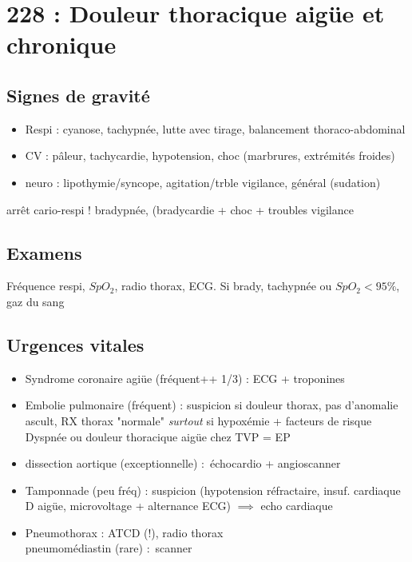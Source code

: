 \documentclass{article}
\newcommand*{\TakeFourierOrnament}[1]{{%
\fontencoding{U}\fontfamily{futs}\selectfont\char#1}}
\newcommand*{\danger}{\TakeFourierOrnament{66}}
\begin{document}
\appendix
\section{228 : Douleur thoracique aigüe et chronique}%
\label{sec:228_douleur_thoracique_aigue_et_chronique}

\subsection{Signes de gravité}
\begin{itemize}
  \item Respi : cyanose, tachypnée, lutte avec tirage, balancement thoraco-abdominal
  \item CV : pâleur, tachycardie, hypotension, choc (marbrures, extrémités
    froides)
  \item neuro : lipothymie/syncope, agitation/trble vigilance, général (sudation)
\end{itemize}

\danger arrêt cario-respi ! bradypnée, (bradycardie + choc + troubles vigilance

\subsection{Examens}
Fréquence respi, $SpO_2$, radio thorax, ECG.
Si {brady, tachy}pnée ou $SpO_2 < 95\%$, gaz du sang

\subsection{Urgences vitales}
\begin{itemize}
  \item Syndrome coronaire agiüe (fréquent++ 1/3) : ECG + troponines
  \item Embolie pulmonaire (fréquent) : suspicion si douleur thorax, pas
    d'anomalie ascult, RX thorax "normale" \textit{surtout}  si hypoxémie +
    facteurs de risque\\
    Dyspnée ou douleur thoracique aigüe chez TVP = EP
  \item dissection aortique (exceptionnelle) : échocardio + angioscanner
  \item Tamponnade (peu fréq) : suspicion (hypotension réfractaire, insuf.
    cardiaque D aigüe, microvoltage + alternance ECG) $\implies$ echo cardiaque
  \item Pneumothorax : ATCD (!), radio thorax \\
    pneumomédiastin (rare) : scanner
\end{itemize}
\end{document}
